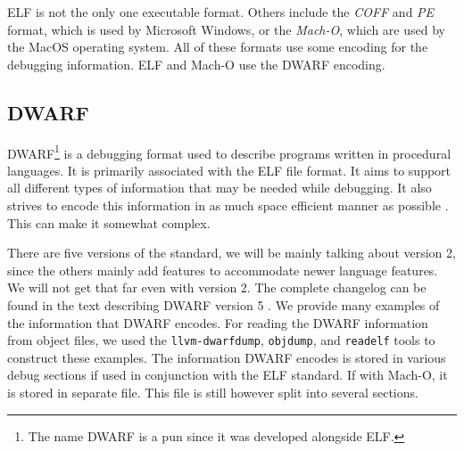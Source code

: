 ELF is not the only one executable format. Others include the \textit{COFF} and
\textit{PE} format, which is used by Microsoft Windows, or the \textit{Mach-O},
which are used by the MacOS operating system. All of these formats use some
encoding for the debugging information. ELF and Mach-O use the DWARF encoding.

\subsection{DWARF}
DWARF\footnote{The name DWARF is a pun since it was developed alongside
ELF.}\cite{dwarf} is a debugging format used to describe programs written in
procedural languages. It is primarily associated with the ELF file format. It
aims to support all different types of information that may be needed while
debugging. It also strives to encode this information in as much space
efficient manner as possible \cite{dwarf}. This can make it somewhat complex. 

There are five versions of the standard, we will be mainly talking about
version 2, since the others mainly add features to accommodate newer language
features. We will not get that far even with version 2. The complete changelog
can be found in the text describing DWARF version 5 \cite{dwarf-5}. We provide
many examples of the information that DWARF encodes. For reading the DWARF
information from object files, we used the \texttt{llvm-dwarfdump},
\texttt{objdump}, and \texttt{readelf} tools to construct these examples. The
information DWARF encodes is stored in various debug sections if used in
conjunction with the ELF standard. If with Mach-O, it is stored in separate
file. This file is still however split into several sections.


